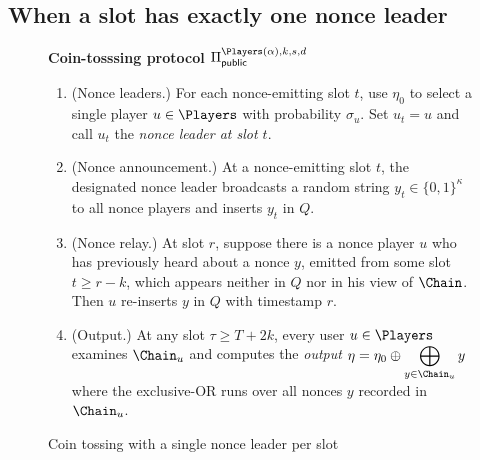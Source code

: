 \subsection{When a slot has exactly one nonce leader}\label{sec:coin-tossing-single-leader}
\newcommand{\CoinTossingPublic}{\Pi_\mathsf{public}^{\Players(\alpha),k,s,d}}

\begin{figure}
  \begin{framed}    
    \begin{center}
        \textbf{Coin-tosssing protocol $\CoinTossingPublic$}
    \end{center}
    \begin{enumerate}
      \item 
      (Nonce leaders.) 
      For each nonce-emitting slot $t$, use $\eta_0$ to 
      select a single player $u \in \Players$ 
      with probability $\sigma_{u}$. 
      Set $u_t = u$ and call $u_t$ the \emph{nonce leader at slot $t$}.
      
      \item 
      (Nonce announcement.)
      At a nonce-emitting slot $t$, the designated nonce leader 
      broadcasts a random string $y_t \in \{0,1\}^\kappa$ 
      to all nonce players and inserts $y_t$ in $Q$. 

      \item 
      (Nonce relay.) 
      At slot $r$, suppose there is a nonce player $u$ who 
      has previously heard about a nonce $y$, 
      emitted from some slot $t \geq r - k$, 
      which appears neither in $Q$ nor in his view of $\Chain$. 
      Then $u$ re-inserts $y$ in $Q$ with timestamp $r$.

      
      
      \item 
      (Output.)
      At any slot $\tau \geq T + 2k$, 
      every user $u \in \Players$ examines $\Chain_u$ 
      and computes the \emph{output} $\displaystyle \eta = \eta_0 \oplus \bigoplus_{y \in \Chain_u} y$ 
      where the exclusive-OR runs over 
      all nonces $y$ recorded in $\Chain_u$. 
    \end{enumerate}
  \end{framed}
  \caption{Coin tossing with a single nonce leader per slot}
  \label{alg:coin-tossing-single-leader}
\end{figure}

